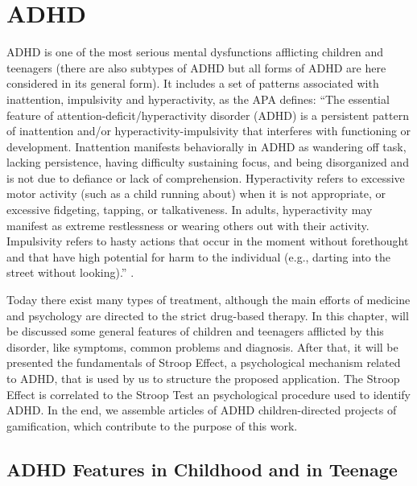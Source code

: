 \chapter{ADHD}

\label{ch:ADHD}


ADHD is one of the most serious mental dysfunctions afflicting children and teenagers (there are also subtypes of ADHD but all forms of ADHD are here considered in its general form). It includes a set of patterns associated with inattention, impulsivity and hyperactivity, as the APA defines: ``The essential feature of attention-deficit/hyperactivity disorder (ADHD) is a persistent pattern of inattention and/or hyperactivity-impulsivity that interferes with functioning or development. Inattention manifests behaviorally in ADHD as wandering off task, lacking persistence, having difficulty sustaining focus, and being disorganized and is not due to defiance or lack of comprehension. Hyperactivity refers to excessive motor activity (such as a child running about) when it is not appropriate, or excessive fidgeting, tapping, or talkativeness. In adults, hyperactivity may manifest as extreme restlessness or wearing others out with their activity. Impulsivity refers to hasty actions that occur in the moment without forethought and that have high potential for harm to the individual (e.g., darting into the street without looking).'' \citep{dsm-american}. 



Today there exist many types of treatment, although the main efforts of medicine and psychology are directed to the strict drug-based therapy. In this chapter, will be discussed some general features of children and teenagers afflicted by this disorder, like symptoms, common problems and diagnosis. After that, it will be presented the fundamentals of Stroop Effect, a psychological mechanism related to ADHD, that is used by us to structure the proposed application. The Stroop Effect is correlated to the Stroop Test an psychological procedure used to identify ADHD. In the end, we assemble articles of ADHD children-directed projects of gamification, which contribute to the purpose of this work. 





\section{ADHD Features in Childhood and in Teenage}



